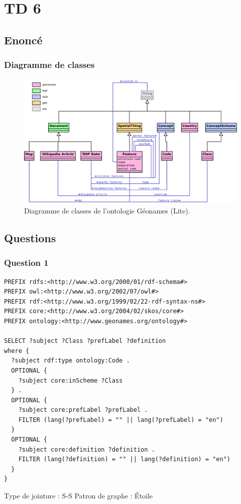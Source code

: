 
\section{TD 6}
\subsection{Enoncé}

\subsubsection{Diagramme de classes}
\begin{figure}[H]
  \includegraphics[width=\textwidth]{../diag_class}
  \caption{Diagramme de classes de l'ontologie Géonames (Lite).}
\end{figure}

\subsection{Questions}
\subsubsection{Question 1}
\begin{verbatim}
PREFIX rdfs:<http://www.w3.org/2000/01/rdf-schema#>
PREFIX owl:<http://www.w3.org/2002/07/owl#>
PREFIX rdf:<http://www.w3.org/1999/02/22-rdf-syntax-ns#>
PREFIX core:<http://www.w3.org/2004/02/skos/core#>
PREFIX ontology:<http://www.geonames.org/ontology#>

SELECT ?subject ?Class ?prefLabel ?definition
where {
  ?subject rdf:type ontology:Code .
  OPTIONAL {
    ?subject core:inScheme ?Class
  } .
  OPTIONAL {
    ?subject core:prefLabel ?prefLabel .
    FILTER (lang(?prefLabel) = "" || lang(?prefLabel) = "en")
  }
  OPTIONAL {
    ?subject core:definition ?definition .
    FILTER (lang(?definition) = "" || lang(?definition) = "en")
  }
}
\end{verbatim}
Type de jointure : S-S Patron de graphe : Étoile

